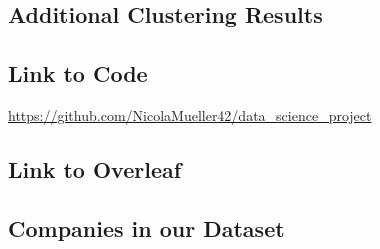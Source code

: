 \documentclass[conference]{IEEEtran}
\begin{document}
\subsection{Additional Clustering Results}


\subsection{Link to Code}
\url{https://github.com/NicolaMueller42/data_science_project}

\subsection{Link to Overleaf}


\subsection{Companies in our Dataset}
\label{sec:appendix-companies}
\end{document}
